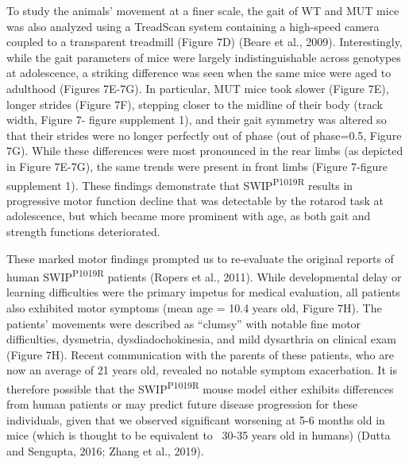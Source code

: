 To study the animals’ movement at a finer scale, the gait of WT and MUT mice was
also analyzed using a TreadScan system containing a high-speed camera coupled to
a transparent treadmill (Figure 7D) (Beare et al., 2009). Interestingly, while
the gait parameters of mice were largely indistinguishable across genotypes at
adolescence, a striking difference was seen when the same mice were aged to
adulthood (Figures 7E-7G). In particular, MUT mice took slower (Figure 7E),
longer strides (Figure 7F), stepping closer to the midline of their body (track
width, Figure 7- figure supplement 1), and their gait symmetry was altered so
that their strides were no longer perfectly out of phase (out of phase=0.5,
Figure 7G). While these differences were most pronounced in the rear limbs (as
depicted in Figure 7E-7G), the same trends were present in front limbs (Figure
7-figure supplement 1). These findings demonstrate that SWIP\textsuperscript{P1019R} results in
progressive motor function decline that was detectable by the rotarod task at
adolescence, but which became more prominent with age, as both gait and strength
functions deteriorated.  

These marked motor findings prompted us to re-evaluate the original reports of
human SWIP\textsuperscript{P1019R} patients (Ropers et al., 2011). While developmental delay or
learning difficulties were the primary impetus for medical evaluation, all
patients also exhibited motor symptoms (mean age = 10.4 years old, Figure 7H).
The patients’ movements were described as “clumsy” with notable fine motor
difficulties, dysmetria, dysdiadochokinesia, and mild dysarthria on clinical
exam (Figure 7H). Recent communication with the parents of these patients, who
are now an average of 21 years old, revealed no notable symptom exacerbation. It
is therefore possible that the SWIP\textsuperscript{P1019R} mouse model either exhibits
differences from human patients or may predict future disease progression for
these individuals, given that we observed significant worsening at 5-6 months
old in mice (which is thought to be equivalent to ~30-35 years old in humans)
(Dutta and Sengupta, 2016; Zhang et al., 2019).

